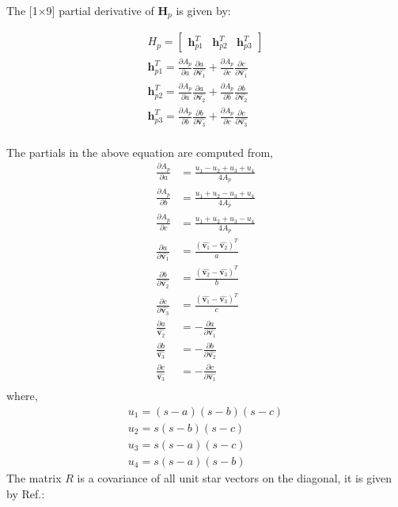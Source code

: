 \documentclass[]{aiaa-tc}%
\begin{document}
The [1$\times$9] partial derivative of $\textbf{H}_p$ is given by:

\begin{subequations}
\begin{align}
H_p =
\begin{bmatrix}
\textbf{h}_{p1}^{T} & \textbf{h}_{p2}^{T} & \textbf{h}_{p3}^{T}
\end{bmatrix} \\
\textbf{h}_{p1}^{T} = \frac{\partial A_p}{\partial a}\frac{\partial a}{\partial \hat{\textbf{v}_1}} + \frac{\partial A_p}{\partial c}\frac{\partial c}{\partial \hat{\textbf{v}_1}}\\
\textbf{h}_{p2}^{T} = \frac{\partial A_p}{\partial a}\frac{\partial a}{\partial \hat{\textbf{v}_2}} + \frac{\partial A_p}{\partial b}\frac{\partial b}{\partial \hat{\textbf{v}_2}}\\
\textbf{h}_{p3}^{T} = \frac{\partial A_p}{\partial b}\frac{\partial b}{\partial \hat{\textbf{v}_3}} + \frac{\partial A_p}{\partial c}\frac{\partial c}{\partial \hat{\textbf{v}_3}}\\
\end{align}
\end{subequations}

The partials in the above equation are computed from,
\begin{subequations}
\begin{align}
\frac{\partial A_p}{\partial a} &= \frac{u_1-u_2+u_3+u_4}{4A_p}\\
\frac{\partial A_p}{\partial b} &= \frac{u_1+u_2-u_3+u_4}{4A_p}\\
\frac{\partial A_p}{\partial c} &= \frac{u_1+u_2+u_3-u_4}{4A_p}\\
\frac{\partial a}{\partial \hat{\textbf{v}_1}} &= \frac{(\hat{\textbf{v}_1}- {\hat{\textbf{v}_2}})^T}{a}\\
\frac{\partial b}{\partial \hat{\textbf{v}_2}}&= \frac{(\hat{\textbf{v}_2}- {\hat{\textbf{v}_3}})^T}{b}\\
\frac{\partial c}{\partial \hat{\textbf{v}_3}} &= \frac{(\hat{\textbf{v}_1}- {\hat{\textbf{v}_3}})^T}{c}\\
\frac{\partial a}{\hat{\textbf{v}_2}} &= - \frac{\partial a}{\partial \hat{\textbf{v}_1}}\\
\frac{\partial b}{\hat{\textbf{v}_3}} &= - \frac{\partial b}{\partial \hat{\textbf{v}_2}}\\
\frac{\partial c}{\hat{\textbf{v}_3}} &= - \frac{\partial c}{\partial \hat{\textbf{v}_1}}\\
\end{align}
\end{subequations}
where,
\begin{subequations}
\begin{align}
u_1 = (s-a)(s-b)(s-c)\\
u_2 = s(s-b)(s-c)\\
u_3 = s(s-a)(s-c)\\
u_4 = s(s-a)(s-b)
\end{align}
\end{subequations}
The matrix $R$ is a covariance of all unit star vectors on the diagonal, it is given by Ref.:
\end{document}

